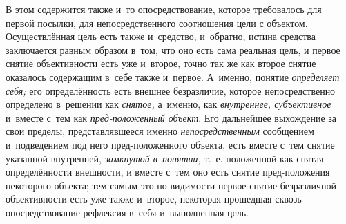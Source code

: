 В этом содержится также и~то опосредствование, которое
требовалось для первой посылки, для непосредственного соотношения цели с
объектом. Осуществлённая цель есть также и~средство, и~обратно, истина
средства заключается равным образом в~том, что оно есть сама реальная цель,
и первое снятие объективности есть уже и~второе, точно так же как второе
снятие оказалось содержащим в~себе также и~первое. А~именно, понятие
{\em определяет себя;} его определённость есть внешнее безразличие, которое
непосредственно определено в~решении как {\em снятое,} а~именно,
как {\em внутреннее, субъективное} и~вместе с~тем как {\em пред-положенный
объект}. Его дальнейшее выхождение за свои пределы, представлявшееся именно
{\em непосредственным}
сообщением и~подведением под него пред-положенного объекта,
есть вместе с~тем снятие указанной внутренней, {\em замкнутой в~понятии,}
т.~е. положенной как снятая определённости внешности, и
вместе с~тем оно есть снятие пред-положения некоторого объекта; тем самым
это по видимости первое снятие безразличной объективности
есть уже также и~второе, некоторая прошедшая сквозь опосредствование
рефлексия в~себя и~выполненная цель.

